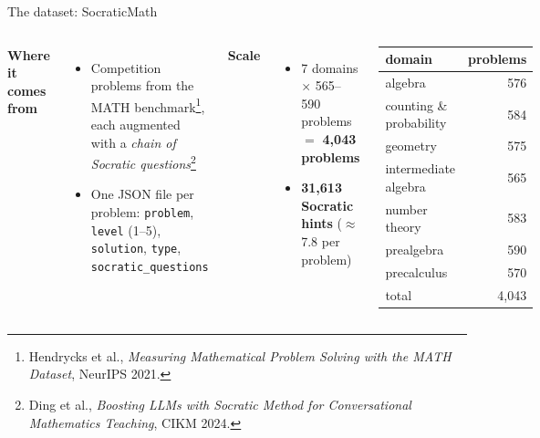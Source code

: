 \documentclass[10pt,aspectratio=169]{beamer}
\begin{document}
\begin{frame}{The dataset: SocraticMath}
  \begin{columns}[T]
    \textbf{Where it comes from}
    \begin{itemize}
      \item Competition problems from the MATH benchmark\footnote{\tiny Hendrycks et al., \emph{Measuring Mathematical Problem Solving with the MATH Dataset}, NeurIPS 2021.}, each augmented with a
            \emph{chain of Socratic questions}\footnote{\tiny Ding et al., \emph{Boosting LLMs with Socratic Method for Conversational Mathematics Teaching}, CIKM 2024.}
      \item One JSON file per problem:
            \texttt{problem}, \texttt{level} (1--5), \texttt{solution}, \texttt{type},
     \texttt{socratic\_questions}
    \end{itemize}
    \medskip
    
    \textbf{Scale}
    \begin{itemize}
      \item 7 domains $\times$ 565--590 problems $=$ \textbf{4{,}043 problems}
      \item \textbf{31{,}613 Socratic hints} ($\approx$ 7.8 per problem)
    \end{itemize}
    
    \begin{center}
      \small
      \begin{tabular}{lr}
        \toprule
        domain & problems \\
        \midrule
        algebra & 576 \\
        counting \& probability & 584 \\
        geometry & 575 \\
        intermediate algebra & 565 \\
        number theory & 583 \\
        prealgebra & 590 \\
        precalculus & 570 \\
        \midrule
        total & 4{,}043 \\
        \bottomrule
      \end{tabular}
    \end{center}
  \end{columns}
\end{frame}
\end{document}
